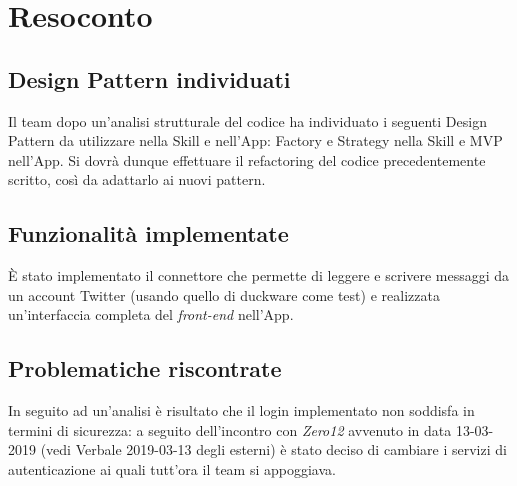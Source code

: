 \clearpage
\section{Resoconto}
	\subsection{Design Pattern individuati}
	\label{sec:pattern}
	Il team dopo un'analisi strutturale del codice ha individuato i seguenti Design Pattern da utilizzare nella Skill e nell’App: Factory e Strategy nella Skill e MVP nell’App. Si dovrà dunque effettuare il refactoring del codice precedentemente scritto, così da adattarlo ai nuovi pattern.
	\subsection{Funzionalità implementate}
	\label{sec:funzionalità}
	È stato implementato il connettore che permette di leggere e scrivere messaggi da un account Twitter (usando quello di duckware come test) e realizzata un’interfaccia completa del \textit{front-end} nell'App.
	\subsection{Problematiche riscontrate}
	\label{sec:problemi}
	In seguito ad un'analisi è risultato che il login implementato non soddisfa in termini di sicurezza: a seguito dell'incontro con \textit{Zero12 } avvenuto in data 13-03-2019 (vedi Verbale 2019-03-13 degli esterni) è stato deciso di cambiare i servizi di autenticazione ai quali tutt'ora il team si appoggiava. 
	
	